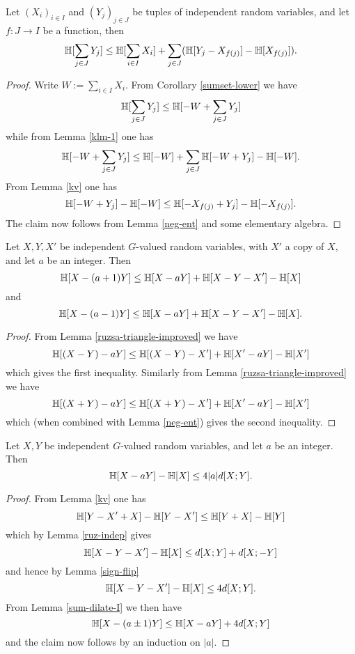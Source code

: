 \begin{lemma}\label{compare-sums}  Let $(X_i)_{i \in I}$ and $(Y_j)_{j \in J}$ be tuples of independent random variables, and let $f: J \to I$ be a function, then
  $$ \mathbb{H}[\sum_{j \in J} Y_j] \leq \mathbb{H}[ \sum_{i \in I} X_i ] + \sum_{j \in J} (\mathbb{H}[ Y_j - X_{f(j)}] - \mathbb{H}[X_{f(j)}]).$$
\end{lemma}

\begin{proof}  Write $W := \sum_{i \in I} X_i$.  From Corollary \ref{sumset-lower} we have
$$ \mathbb{H}[\sum_{j \in J} Y_j]  \leq \mathbb{H}[-W + \sum_{j \in J} Y_j]$$
while from Lemma \ref{klm-1} one has
$$ \mathbb{H}[-W + \sum_{j \in J} Y_j] \leq \mathbb{H}[-W] + \sum_{j \in J} \mathbb{H}[-W + Y_j] - \mathbb{H}[-W].$$
From Lemma \ref{kv} one has
$$ \mathbb{H}[-W + Y_j] - \mathbb{H}[-W] \leq \mathbb{H}[-X_{f(j)} + Y_j] - \mathbb{H}[-X_{f(j)}].$$
The claim now follows from Lemma \ref{neg-ent} and some elementary algebra.
\end{proof}

\begin{lemma}\label{sum-dilate-I}  Let $X,Y,X'$ be independent $G$-valued random variables, with $X'$ a copy of $X$, and let $a$ be an integer.  Then
$$\mathbb{H}[X-(a+1)Y] \leq \mathbb{H}[X-aY] + \mathbb{H}[X-Y-X'] - \mathbb{H}[X]$$
and
$$\mathbb{H}[X-(a-1)Y] \leq \mathbb{H}[X-aY] + \mathbb{H}[X-Y-X'] - \mathbb{H}[X].$$
\end{lemma}

\begin{proof}
From Lemma \ref{ruzsa-triangle-improved} we have
$$ \mathbb{H}[(X-Y)-aY] \leq \mathbb{H}[(X-Y) - X'] + \mathbb{H}[X'-aY] - \mathbb{H}[X']$$
which gives the first inequality.  Similarly from Lemma \ref{ruzsa-triangle-improved} we have
$$ \mathbb{H}[(X+Y)-aY] \leq \mathbb{H}[(X+Y) - X'] + \mathbb{H}[X'-aY] - \mathbb{H}[X']$$
which (when combined with Lemma \ref{neg-ent}) gives the second inequality.
\end{proof}

\begin{lemma}\label{sum-dilate-II}  Let $X,Y$ be independent $G$-valued random variables, and let $a$ be an integer.  Then
  $$\mathbb{H}[X-aY] - \mathbb{H}[X] \leq 4 |a| d[X;Y].$$
\end{lemma}

\begin{proof} From Lemma \ref{kv} one has
  $$ \mathbb{H}[Y-X'+X] - \mathbb{H}[Y-X'] \leq \mathbb{H}[Y+X] - \mathbb{H}[Y]$$
  which by Lemma \ref{ruz-indep} gives
  $$ \mathbb{H}[X-Y-X'] -\mathbb{H}[X] \leq d[X;Y] + d[X;-Y]$$
  and hence by Lemma \ref{sign-flip}
  $$ \mathbb{H}[X-Y-X'] -\mathbb{H}[X] \leq 4d[X;Y].$$
  From Lemma \ref{sum-dilate-I} we then have
  $$\mathbb{H}[X-(a\pm 1)Y] \leq \mathbb{H}[X-aY] + 4 d[X;Y]$$
and the claim now follows by an induction on $|a|$.
\end{proof}

